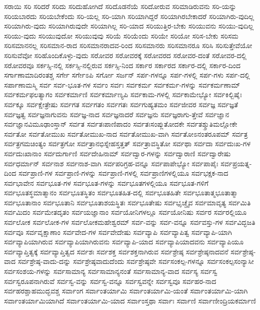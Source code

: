 {ಸರಾಯಿ
ಸರಿ
ಸರಿದರೆ
ಸರಿದು
ಸರಿದುಹೋಗಿದೆ
ಸರಿದೊಡನೆಯೆ
ಸರಿದೋರುವ
ಸರಿಮಾಡಿರುವನು
ಸರಿ-ಯನ್ನು
ಸರಿಯಬಾರದು
ಸರಿಯಬೇಕೆಂದು
ಸರಿ-ಯಲ್ಲ
ಸರಿ-ಯಾಗಿ
ಸರಿಯಾಗಿದ್ದರೆ
ಸರಿಯಾಗಿರಬೇಕಾದರೆ
ಸರಿಯಾಗಿರು-ವುದಿಲ್ಲ
ಸರಿಯಾಗಿರು-ವುದು
ಸರಿಯಾಗಿರುವುದೇ
ಸರಿಯಾಗಿಲ್ಲ
ಸರಿ-ಯಾದ
ಸರಿಯುತ್ತಿರ-ಬೇಕು
ಸರಿಯುವನು
ಸರಿಯು-ವುದಿಲ್ಲ
ಸರಿಯು-ವುದು
ಸರಿಯುವುದೋ
ಸರಿಯುವುವು
ಸರಿಯೆ
ಸರಿಯೆಂದು
ಸರಿಯೇ
ಸರಿಯೋ
ಸರಿಸ-ಬೇಕು
ಸರಿಸಮ
ಸರಿಸಮಾನನಲ್ಲ
ಸರಿಸಮಾನ-ರಾದ
ಸರಿಸಮಾನರಾದವ-ರಿಂದ
ಸರಿಸಮಾನರು
ಸರಿಸಮಾನರೂ
ಸರಿಸಿ
ಸರಿಸುತ್ತೇವೆಯೋ
ಸರಿಸುವೆವೋ
ಸರಿಹೊಂದಿಕೊಳ್ಳು-ವುದು
ಸರೋವರ
ಸರೋವರಕ್ಕೆ
ಸರೋವರದ
ಸರೋವರ-ದಂತೆ
ಸರೋವರ-ದಲ್ಲಿ
ಸರೋವರವೂ
ಸರ್ಕಸ್ಸಿ-ನಲ್ಲಿ
ಸರ್ಕಸ್ಸಿ-ನಲ್ಲಿರುವ
ಸರ್ಕಸ್ಸಿ-ನಿಂದ
ಸರ್ಕಾರ
ಸರ್ಕಾರದ
ಸರ್ಕಾರ-ದಲ್ಲಿ
ಸರ್ಕಾರ-ದಿಂದ
ಸರ್ಗಾಣಾಮಾದಿರಂತಶ್ಚ
ಸರ್ಗೇ
ಸರ್ಗೇಽಪಿ
ಸರ್ಗೋ
ಸರ್ಜನ್
ಸರ್ಪ-ಗಳನ್ನೂ
ಸರ್ಪ-ಗಳಲ್ಲಿ
ಸರ್ಪ-ಗಳು
ಸರ್ಪ-ದಲ್ಲಿ
ಸರ್ಪಾಣಾಮಸ್ಮಿ
ಸರ್ವ
ಸರ್ವ-ಭೂತ-ಗಳ
ಸರ್ವಂ
ಸರ್ವಃ
ಸರ್ವಕರ್ಮ
ಸರ್ವಕರ್ಮ-ಗಳನ್ನು
ಸರ್ವಕರ್ಮಣಾಮ್
ಸರ್ವಕರ್ಮಫಲತ್ಯಾಗಂ
ಸರ್ವಕರ್ಮಾಣಿ
ಸರ್ವಕರ್ಮಾಣ್ಯಪಿ
ಸರ್ವಕಾಮ-ಗಳಲ್ಲಿ
ಸರ್ವಕಾಮೇಭ್ಯೋ
ಸರ್ವಕಿಲ್ಬಿಷೈಃ
ಸರ್ವಕ್ಕೂ
ಸರ್ವಕ್ಷೇತ್ರೇಷು
ಸರ್ವಗತ
ಸರ್ವಗತಂ
ಸರ್ವಗತಃ
ಸರ್ವಗುಹ್ಯತಮಂ
ಸರ್ವಜೀವರ
ಸರ್ವಜ್ಞ
ಸರ್ವಜ್ಞತೆ
ಸರ್ವಜ್ಞತ್ವ
ಸರ್ವಜ್ಞನಾಗುವನು
ಸರ್ವಜ್ಞ-ನಾದ
ಸರ್ವಜ್ಞನಾದರೆ
ಸರ್ವಜ್ಞನು
ಸರ್ವಜ್ಞರಾಗು-ತ್ತೇವೆ
ಸರ್ವಜ್ಞಾನ
ಸರ್ವಜ್ಞಾನವಿಮೂಢಾಂಸ್ತಾನ್
ಸರ್ವತ
ಸರ್ವತಃಪಾಣಿಪಾದಂ
ಸರ್ವತಃಸಂಪ್ಲುತೋದಕೇ
ಸರ್ವತಶ್ಶ್ರುತಿಮಲ್ಲೋಕೇ
ಸರ್ವತೋ
ಸರ್ವತೋಮುಖ
ಸರ್ವತೋಮುಖ-ನಾದ
ಸರ್ವತೋಮುಖ-ವಾಗಿ
ಸರ್ವತೋಽನಂತರೂಪಮ್
ಸರ್ವತ್ರ
ಸರ್ವತ್ರಗಮಚಿಂತ್ಯಂ
ಸರ್ವತ್ರಗೋ
ಸರ್ವತ್ರಾನಭಿಸ್ನೇಹಸ್ತತ್ತತ್
ಸರ್ವತ್ರಾವಸ್ಥಿತೋ
ಸರ್ವಥಾ
ಸರ್ವದಾ
ಸರ್ವದುಃಖ-ಗಳ
ಸರ್ವದುಃಖಾನಾಂ
ಸರ್ವದುರ್ಗಾಣಿ
ಸರ್ವದೇಹಿನಾಮ್
ಸರ್ವದ್ವಾರ-ಗಳನ್ನು
ಸರ್ವದ್ವಾರಾಣಿ
ಸರ್ವದ್ವಾರೇಷು
ಸರ್ವಧರ್ಮಾನ್
ಸರ್ವನಾಶ
ಸರ್ವನಾಶ-ವಾಗಿ
ಸರ್ವಪರಿಗ್ರಹ-ವನ್ನೂ
ಸರ್ವಪಾಪೇಭ್ಯೋ
ಸರ್ವಪಾಪೈಃ
ಸರ್ವಪ್ರಯತ್ನ-ದಿಂದ
ಸರ್ವಪ್ರಾಣಿ-ಗಳ
ಸರ್ವಪ್ರಾಣಿ-ಗಳನ್ನು
ಸರ್ವಪ್ರಾಣಿ-ಗಳಲ್ಲಿ
ಸರ್ವಪ್ರಾಣಿಗಳಲ್ಲಿಯೂ
ಸರ್ವಭಕ್ಷಕ-ನಾದ
ಸರ್ವಭಾವೇನ
ಸರ್ವಭೂತ-ಗಳ
ಸರ್ವಭೂತ-ಗಳನ್ನು
ಸರ್ವಭೂತಗಳಲ್ಲಿಯೂ
ಸರ್ವಭೂತ-ಗಳಿಗೆ
ಸರ್ವಭೂತಸ್ಥಮಾತ್ಮಾನಂ
ಸರ್ವಭೂತಸ್ಥಿತಂ
ಸರ್ವಭೂತಹಿತ-ದಲ್ಲಿ
ಸರ್ವಭೂತಹಿತೇ
ಸರ್ವಭೂತಾತ್ಮಭೂತಾತ್ಮಾ
ಸರ್ವಭೂತಾನಾಂ
ಸರ್ವಭೂತಾನಿ
ಸರ್ವಭೂತಾಶಯಸ್ಥಿತಃ
ಸರ್ವಭೂತೇಷು
ಸರ್ವಭೃಚ್ಚೈವ
ಸರ್ವಮಾವೃತ್ಯ
ಸರ್ವಮಿತಿ
ಸರ್ವಮಿದಂ
ಸರ್ವಮೇತದೃತಂ
ಸರ್ವಯಜ್ಞಾನಾಂ
ಸರ್ವಯೋನಿಗಳಲ್ಲೂ
ಸರ್ವಯೋನಿಷು
ಸರ್ವರ
ಸರ್ವರಲ್ಲಿಯೂ
ಸರ್ವಲೋಕ
ಸರ್ವಲೋಕ-ಗಳ
ಸರ್ವಲೋಕಮಹೇಶ್ವರಮ್
ಸರ್ವ-ವನ್ನು
ಸರ್ವ-ವನ್ನೂ
ಸರ್ವವಸ್ತು-ಗಳ
ಸರ್ವವಿದ್ಭಜತಿ
ಸರ್ವವೂ
ಸರ್ವವೃಕ್ಷಾಣಾಂ
ಸರ್ವವೇದ-ಗಳ
ಸರ್ವವೇದೇಷು
ಸರ್ವವ್ಯಾಪಿ
ಸರ್ವವ್ಯಾಪಿತ್ವ
ಸರ್ವವ್ಯಾಪಿ-ಯಾಗಿ
ಸರ್ವವ್ಯಾಪಿಯಾಗಿರುವ
ಸರ್ವವ್ಯಾಪಿಯಾಗಿರುವನು
ಸರ್ವವ್ಯಾಪಿ-ಯಾದ
ಸರ್ವವ್ಯಾಪಿಯಾದವನು
ಸರ್ವವ್ಯಾಪಿಯೂ
ಸರ್ವವ್ಯಾಪ್ತಿತ್ವಕ್ಕೆ
ಸರ್ವವ್ಯಾಪ್ತಿತ್ವದ
ಸರ್ವಶಃ
ಸರ್ವಶಕ್ತ
ಸರ್ವಶಕ್ತನಾಗಿರುವ
ಸರ್ವಶ್ರೇಷ್ಠ
ಸರ್ವಶ್ರೇಷ್ಠನಾದವನೆ
ಸರ್ವಶ್ರೇಷ್ಠ-ವಾದ
ಸರ್ವಶ್ರೇಷ್ಠ-ವಾದು-ದನ್ನು
ಸರ್ವಶ್ರೇಷ್ಠವಾದುದೆಂದು
ಸರ್ವಶ್ರೇಷ್ಠವೇ
ಸರ್ವಸಂಕಲ್ಪ-ಗಳನ್ನೂ
ಸರ್ವಸಂಕಲ್ಪಸಂನ್ಯಾಸೀ
ಸರ್ವಸಂಶಯ-ಗಳನ್ನು
ಸರ್ವಸಾಮಾನ್ಯ
ಸರ್ವಸಾಮಾನ್ಯನಂತೆ
ಸರ್ವಸಾಮಾನ್ಯ-ವಾದ
ಸರ್ವಸ್ಯ
ಸರ್ವಸ್ವ
ಸರ್ವಸ್ವರೂಪನಾಗಿರುವೆ
ಸರ್ವಸ್ವ-ವನ್ನು
ಸರ್ವಸ್ವ-ವನ್ನೂ
ಸರ್ವಸ್ವವನ್ನೇ
ಸರ್ವಸ್ವವೂ
ಸರ್ವಹರ-ನಾದ
ಸರ್ವಹರಶ್ಚಾಹಮುದ್ಭವಶ್ಚ
ಸರ್ವಾಂಗ
ಸರ್ವಾಂತರ್ಯಾಮಿ
ಸರ್ವಾಂತರ್ಯಾಮಿ-ಯಂತೆ
ಸರ್ವಾಂತರ್ಯಾಮಿ-ಯಾಗಿ
ಸರ್ವಾಂತರ್ಯಾಮಿಯಾಗಿದೆ
ಸರ್ವಾಂತರ್ಯಾಮಿ-ಯಾದ
ಸರ್ವಾಂಸ್ತಥಾ
ಸರ್ವಾಃ
ಸರ್ವಾಣಿ
ಸರ್ವಾಣೀಂದ್ರಿಯಕರ್ಮಾಣಿ
}

